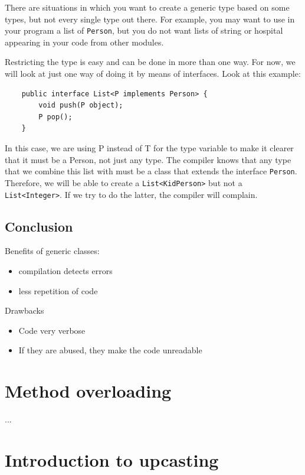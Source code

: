 There are situations in which you want to create a generic type based
on some types, but not every single type out there. For example, you
may want to use in your program a list of \verb+Person+, but you do
not want lists of string or hospital appearing in your code from other
modules. 

Restricting the type is easy and can be done in more than one way. For
now, we will look at just one way of doing it by means of
interfaces. Look at this example:

\begin{verbatim}
    public interface List<P implements Person> {
        void push(P object);
        P pop();
    }
\end{verbatim}

In this case, we are using P instead of T for the type variable to
make it clearer that it must be a Person, not just any type. The
compiler knows that any type that we combine this list with must be a
class that extends the interface \verb+Person+. Therefore, we will be
able to create a \verb+List<KidPerson>+ but not a
\verb+List<Integer>+. If we try to do the latter, the compiler will
complain. 

\subsection{Conclusion}
\label{sec:conclusion-2}

Benefits of generic classes: 

\begin{itemize}
\item compilation detects errors
\item less repetition of code
\end{itemize}

Drawbacks

\begin{itemize}
\item Code very verbose
\item If they are abused, they make the code unreadable
\end{itemize}

\section{Method overloading}
\label{sec:method-overloading}

...

\section{Introduction to upcasting}
\label{sec:upcasting}

